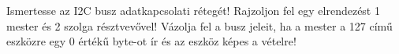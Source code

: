 \begin{example}

Ismertesse az I2C busz adatkapcsolati rétegét! Rajzoljon fel egy elrendezést 1 mester és 2 szolga résztvevővel! Vázolja fel a busz jeleit, ha a mester a 127 című eszközre egy 0 értékű byte-ot ír és az eszköz képes a vételre!

\tcbline
\vspace{1mm}

\solution

\end{example}